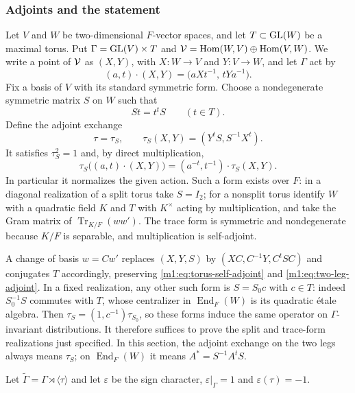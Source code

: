 \subsubsection{Adjoints and the statement}\label{m1:subsec:two-leg-statement}

Let $V$ and $W$ be two-dimensional $F$-vector spaces, and let
$T\subset \operatorname{GL}(W)$ be a maximal torus.  Put \(\Gamma=\operatorname{GL}(V)\times T\) and \(\mathcal V=\operatorname{Hom}(W,V)\oplus
\operatorname{Hom}(V,W)\). We write a point of $\mathcal V$ as $(X,Y)$, with \(X:W\longrightarrow V\) and
\(Y:V\longrightarrow W\), and let $\Gamma$ act by
\[
    (a,t)\cdot(X,Y)=\bigl(aXt^{-1},\,tYa^{-1}\bigr).
\]
Fix a basis of $V$ with its standard symmetric form. Choose a
nondegenerate symmetric matrix $S$ on $W$ such that
\begin{equation}\label{m1:eq:torus-self-adjoint}
 S t=t^t S\qquad(t\in T).
\end{equation}
Define the adjoint exchange
\begin{equation}\label{m1:eq:two-leg-adjoint}
 \tau=\tau_S,\qquad \tau_S(X,Y)=(Y^tS,S^{-1}X^t).
\end{equation}
It satisfies $\tau_S^2=1$ and, by direct multiplication,
\[
 \tau_S\bigl((a,t)\cdot(X,Y)\bigr)
 =(a^{-t},t^{-1})\cdot\tau_S(X,Y).
\]
In particular it normalizes the given action. Such a form exists over $F$:
in a diagonal realization of a split torus take $S=I_2$; for a nonsplit
torus identify $W$ with a quadratic field $K$ and $T$ with $K^\times$
acting by multiplication, and take the Gram matrix of
$\operatorname{Tr}_{K/F}(ww')$. The trace form is symmetric and
nondegenerate because $K/F$ is separable, and multiplication is self-adjoint.

A change of basis $w=Cw'$ replaces $(X,Y,S)$ by
$(XC,C^{-1}Y,C^tSC)$ and conjugates $T$ accordingly, preserving \eqref{m1:eq:torus-self-adjoint} and
\eqref{m1:eq:two-leg-adjoint}. In a fixed realization, any other such form is
$S=S_0c$ with $c\in T$: indeed $S_0^{-1}S$ commutes with $T$, whose
centralizer in $\operatorname{End}_F(W)$ is its quadratic \'{e}tale algebra.
Then $\tau_S=(1,c^{-1})\tau_{S_0}$, so these forms induce the same
operator on $\Gamma$-invariant distributions. It therefore suffices to prove
the split and trace-form realizations just specified. In this section,
the adjoint exchange on the two legs always means $\tau_S$; on
$\operatorname{End}_F(W)$ it means $A^*=S^{-1}A^tS$.

Let \(\widetilde \Gamma=\Gamma\rtimes\langle\tau\rangle\) and let $\varepsilon$ be the sign character,
\(\varepsilon|_\Gamma=1\) and \(\varepsilon(\tau)=-1\).

